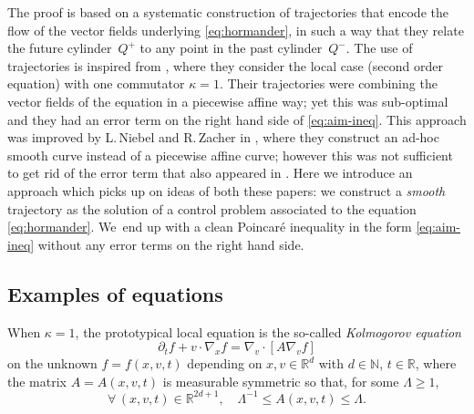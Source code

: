 \documentclass[JEP,XML,SOM,Unicode,NoFloatCountersInSection,published]{cedram}
\theoremstyle{definition}
\newcommand\N{{\mathbb N}}
\newcommand\R{{\mathbb R}}
\begin{document}
The proof is based on a systematic construction of trajectories that encode the flow of the vector fields underlying \eqref{eq:hormander}, in such a way that they relate the future cylinder~$Q^+$ to any point in the past cylinder~$Q^-$.
The use of trajectories is inspired from \cite{guerand-mouhot}, where they consider the local case (second order equation) with one commutator $\kappa = 1$. Their trajectories were combining the vector fields of the equation in a piecewise affine way; yet this was sub-optimal and they had an error term on the right hand side of \eqref{eq:aim-ineq}. This approach was improved by L.\,Niebel and R.\,Zacher in \cite{niebel2022kinetic}, where they construct an ad-hoc smooth curve instead of a piecewise affine curve; however this was not sufficient to get rid of the error term that also appeared in \cite{guerand-mouhot}. Here we introduce an approach which picks up on ideas of both these papers: we construct a \textit{smooth} trajectory as the solution of a control problem associated to the equation \eqref{eq:hormander}. We~end up with a clean Poincaré inequality in the form \eqref{eq:aim-ineq} without any error terms on the right hand side.

\subsection{Examples of equations}

When $\kappa=1$, the prototypical local equation is the so-called
\emph{Kolmogorov equation}
\begin{equation}
\label{eq:kolmo}
\partial_t f + v \cdot \nabla_x f = \nabla_v \cdot \left[ A
\nabla_v f \right]
\end{equation}
on the unknown $f=f(x,v,t)$ depending on $x,v \in \R^d$ with
$d \in \N$, $t \in \R$, where the matrix $A=A(x,v,t)$ is
measurable symmetric so that, for some $\Lambda \ge 1$,
\begin{equation}
\label{eq:ellip-1}
\forall \, (x,v,t) \in \R^{2d+1}, \quad \Lambda^{-1} \le
A(x,v,t) \le \Lambda.
\end{equation}
\end{document}
